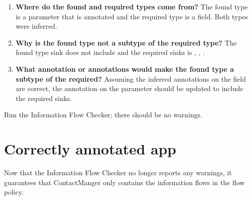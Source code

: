  \begin{enumerate}

\item\textbf{Where do the found and required types come from?}
   The found type is a parameter that is annotated and the required type is a field.  Both 
   types were inferred.
\item  \textbf{ Why is the found type not a subtype of the required type?}
  The found type sink does not include and the required sinks is , 
  , . 
\item  \textbf{What annotation or annotations would make the found type a subtype of the required?}
Assuming the inferred annotations on the field are correct, the annotation on the parameter should be 
updated to include the required sinks.
   \end{enumerate}

Run the Information Flow Checker; there should be no warnings.

  \section{Correctly annotated app}  
     Now that the Information Flow Checker no longer reports any warnings, it guarantees that
     ContactManger only contains the information flows in the flow policy.  

 
%
%
%
%
